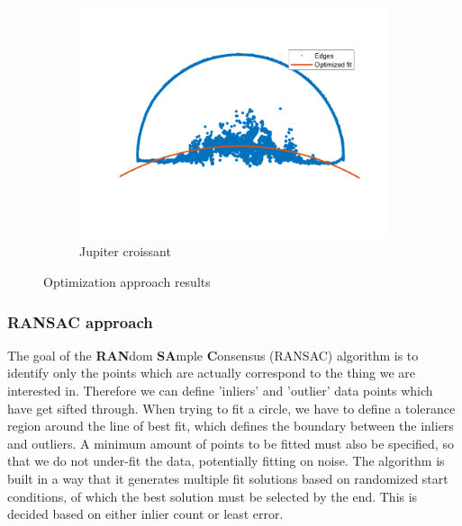 \begin{figure}[!ht]
\begin{subfigure}{0.32\textwidth}
        \includegraphics[width=\textwidth]{Doc/Graphics/Part3/Optimization_jupiter_partial.png}
        \caption{Jupiter croissant}
    \end{subfigure}
    \caption{Optimization approach results}
    \label{fig:enter-label}
\end{figure}

\subsubsection{RANSAC approach}

The goal of the \textbf{RAN}dom \textbf{SA}mple \textbf{C}onsensus (RANSAC) algorithm is to identify only the points which are actually correspond to the thing we are interested in. Therefore we can define 'inliers' and 'outlier' data points which have get sifted through. When trying to fit a circle, we have to define a tolerance region around the line of best fit, which defines the boundary between the inliers and outliers. A minimum amount of points to be fitted must also be specified, so that we do not under-fit the data, potentially fitting on noise. The algorithm is built in a way that it generates multiple fit solutions based on randomized start conditions, of which the best solution must be selected by the end. This is decided based on either inlier count or least error.


